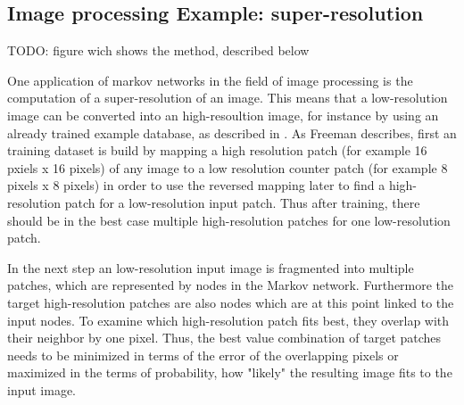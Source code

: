 \subsection{Image processing Example: super-resolution}

TODO: figure wich shows the method, described below

One application of markov networks in the field of image processing is the computation of a super-resolution of an image. This means that a low-resolution image can be converted into an high-resoultion image, for instance by using an already trained example database, as described in \cite{freeman2002example}. As Freeman describes, first an training dataset is build by mapping a high resolution patch (for example 16 pxiels x 16 pixels) of any image to a low resolution counter patch (for example 8 pixels x 8 pixels) in order to use the reversed mapping later to find a high-resolution patch for a low-resolution input patch. Thus after training, there should be in the best case multiple high-resolution patches for one low-resolution patch.

In the next step an low-resolution input image is fragmented into multiple patches, which are represented by nodes in the Markov network. Furthermore the target high-resolution patches are also nodes which are at this point linked to the input nodes. To examine which high-resolution patch fits best, they overlap with their neighbor by one pixel. Thus, the best value combination of target patches needs to be minimized in terms of the error of the overlapping pixels or maximized in the terms of probability, how "likely" the resulting image fits to the input image.
